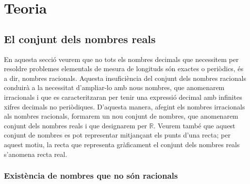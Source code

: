 \chapter{Teoria}
\label{cap:teoria}

\section{El conjunt dels nombres reals}

En aquesta secció veurem que no tots els nombres decimals que necessitem per
resoldre problemes elementals de mesura de longituds són exactes o periòdics,
és a dir, nombres racionals. Aquesta insuficiència del conjunt dels nombres
racionals conduirà a la necessitat d’ampliar-lo amb nous nombres, que
anomenarem irracionals i que es caracteritzaran per tenir una expressió decimal
amb infinites xifres decimals no periòdiques. D’aquesta manera, afegint els
nombres irracionals als nombres racionals, formarem un nou conjunt de nombres,
que anomenarem conjunt dels nombres reals i que designarem per $\mathbb{R}$.
Veurem també que aquest conjunt de nombres es pot representar mitjançant els
punts d’una recta; per aquest motiu, la recta que representa gràficament el
conjunt dels nombres reals s’anomena recta real.

\subsection{Existència de nombres que no són racionals}

